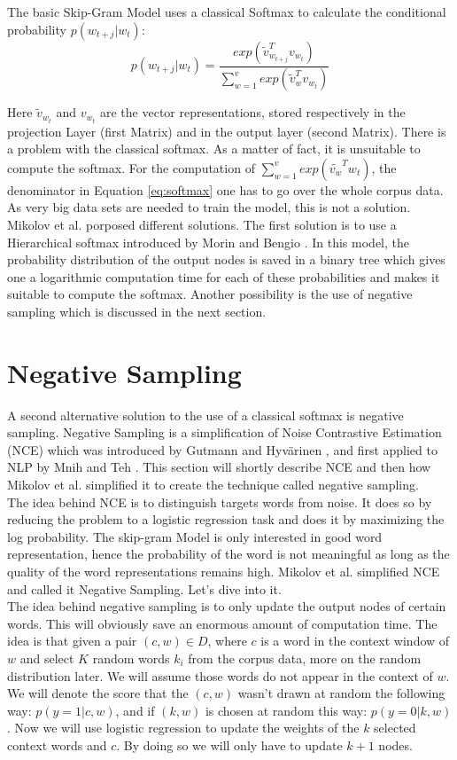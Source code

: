The basic Skip-Gram Model uses a classical Softmax to calculate the conditional probability $p(w_{t+j}|w_t)$: 
   \begin{equation} \label{eq:softmax}
   p(w_{t+j}|w_t)=  \frac{exp( \tilde{v}_{w_{t+j}}^Tv_{w_t})}{\sum_{w=1}^v exp(\tilde{v}_w^Tv_{ w_t})}
   \end{equation}
  
  Here $\tilde{v}_{w_t}$ and $ v_{w_t}$ are the vector representations, stored respectively in the projection Layer (first Matrix) and in the output layer (second Matrix). There is a problem with the classical softmax. As a matter of fact, it is unsuitable to compute the softmax. For the computation of $\sum_{w=1}^v exp(\tilde{v_w}^T w_t)$, the denominator in Equation \ref{eq:softmax} one has to go over the whole corpus data. As very big data sets are needed to train the model, this is not a solution. Mikolov et al. \cite{mikolov2} porposed different solutions. The first solution is to use a Hierarchical softmax introduced by Morin and Bengio \cite{hsoftmax}. In this model, the probability distribution of the output nodes is saved in a binary tree which gives one a logarithmic computation time for each of these probabilities and makes it suitable to compute the softmax. Another possibility is the use of negative sampling which is discussed in the next section.

\section{Negative Sampling}
A second alternative solution to the use of a classical softmax is negative sampling. Negative Sampling is a simplification of Noise Contrastive Estimation (NCE) which was introduced by Gutmann and Hyv{\"a}rinen \cite{nce-original},  and first applied to NLP by Mnih and Teh \cite{mnih}. This section will shortly describe NCE and then how Mikolov et al. simplified it to create the technique called negative sampling. \\The idea behind NCE is to distinguish targets words from noise. It does so by reducing the problem to a logistic regression task and does it by maximizing the log probability. The skip-gram Model is only interested in good word representation, hence the probability of the word is not meaningful as long as the quality of the word representations remains high. Mikolov et al. \cite{mikolov2} simplified NCE and called it Negative Sampling. Let's dive into it.\\
The idea behind negative sampling is to only update the output nodes of certain words. This will obviously save an enormous amount of computation time. The idea is that given a pair $(c,w) \in D$, where $c$ is a word in the context window of $w$ and select $K$ random words $k_i$ from the corpus data, more on the random distribution later. We will assume those words do not appear in the context of $w$. We will denote the score that the $(c,w)$ wasn't drawn at random the following way: $p(y=1|c,w)$, and if $(k,w) $ is chosen at random this way: $p(y=0|k,w)$.  Now we will use logistic regression to update the weights of the $k$ selected context words and $c$. By doing so we will only have to update $k+1$ nodes.

